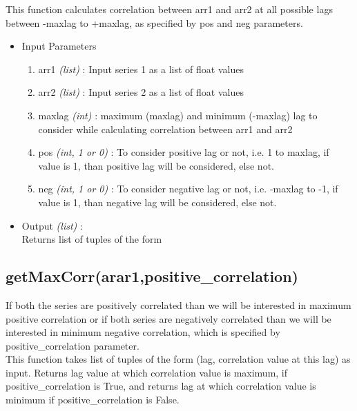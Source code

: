 This function calculates correlation between arr1 and arr2 at all possible lags 
between -maxlag to +maxlag, as specified by pos and neg parameters.

\begin{itemize}
 \item Input Parameters
 
 \begin{enumerate}
  \item arr1 \textit{(list)} : Input series 1 as a list of float values
  \item arr2 \textit{(list)} : Input series 2 as a list of float values
  \item maxlag \textit{(int)} : maximum (maxlag) and minimum (-maxlag) lag to 
consider while calculating correlation between arr1 and arr2
  \item pos \textit{(int, 1 or 0)} : To consider positive lag or not, i.e. 1 to 
maxlag, if value is 1, than positive lag will be considered, else not.
  \item neg \textit{(int, 1 or 0)} : To consider negative lag or not, i.e. 
-maxlag to -1, if value is 1, than negative lag will be considered, else not.
 \end{enumerate}

 \item Output \textit{(list)} : \\
  Returns list of tuples of the form \\
 
\end{itemize}

\subsection{getMaxCorr(arar1,positive\_correlation)}

If both the series are positively correlated than we will be 
interested in maximum positive correlation or if both series are negatively 
correlated than we will be interested in minimum negative correlation, which is 
specified by positive\_correlation parameter.
\\
This function takes list of tuples of the form (lag, correlation value at this 
lag) as  input. Returns lag value at which correlation value is maximum, if 
positive\_correlation is True, and returns lag at which correlation value is 
minimum if positive\_correlation is False. \\



